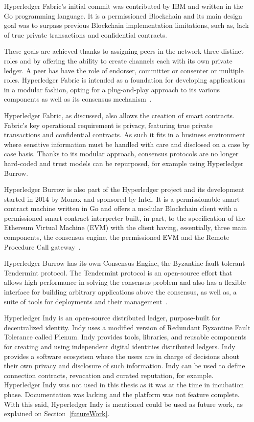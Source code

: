 Hyperledger Fabric’s initial commit was contributed by IBM and written in the
Go programming language.  It is a permissioned Blockchain and its main design
goal was to surpass previous Blockchain implementation limitations, such as,
lack of true private transactions and confidential contracts.

These goals are achieved thanks to assigning peers in the network three
distinct roles and by offering the ability to create channels each with its own
private ledger.  A peer has have the role of endorser, committer or consenter
or multiple roles.  Hyperledger Fabric is intended as a foundation for
developing applications in a modular fashion, opting for a plug-and-play
approach to its various components as well as its consensus
mechanism~\cite{HyperledgerFabricDocs2017}.

Hyperledger Fabric, as discussed, also allows the creation of smart contracts.
Fabric's key operational requirement is privacy, featuring true private
transactions and confidential contracts. As such it fits in a business
environment where sensitive information must be handled with care and disclosed
on a case by case basis. Thanks to its modular approach, consensus protocols
are no longer hard-coded and trust models can be repurposed, for example using
Hyperledger Burrow.

Hyperledger Burrow is also part of the Hyperledger project and its development
started in 2014 by Monax and sponsored by Intel. It is a permissionable smart
contract machine written in Go and offers a modular Blockchain client with a
permissioned smart contract interpreter built, in part, to the specification of
the Ethereum Virtual Machine (EVM) with the client having, essentially, three
main components, the consensus engine, the permissioned EVM and the Remote
Procedure Call gateway~\cite{Kuhlman2017,HyperledgerBurrow2017}.

Hyperledger Burrow has its own Consensus Engine, the Byzantine fault-tolerant
Tendermint protocol.  The Tendermint protocol is an open-source effort that
allows high performance in solving the consensus problem and also has a
flexible interface for building arbitrary applications above the consensus, as
well as, a suite of tools for deployments and their
management~\cite{Buchman2016}.

Hyperledger Indy is an open-source distributed ledger, purpose-built for
decentralized identity. Indy uses a modified version of Redundant Byzantine
Fault Tolerance called Plenum. Indy provides tools, libraries, and reusable
components for creating and using independent digital identities distributed
ledgers. Indy provides a software ecosystem where the users are in charge of
decisions about their own privacy and disclosure of such information.  Indy can
be used to define connection contracts, revocation and curated reputation, for
example. Hyperledger Indy was not used in this thesis as it was at the time in
incubation phase. Documentation was lacking and the platform was not feature
complete. With this said, Hyperledger Indy is mentioned could be used as future
work, as explained on Section~\ref{futureWork}.

